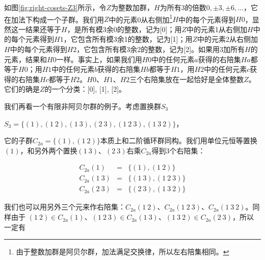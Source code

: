 \documentclass[b5paper]{ctexart}
\begin{document}
如图\ref{fig:right-cosets-Z3}所示，令$Z$为整数加群，$H$为所有3的倍数$0, \pm 3, \pm 6, ...$，它在加法下构成一个子群。我们用$Z$中的元素0从右侧加\footnote{由于整数加群是阿贝尔群，加法满足交换律，所以左右陪集相同。}$H$中的每个元素得到$H0$，显然这一结果还等于$H$，是所有模3余0的整数，记为[0]；用$Z$中的元素1从右侧加$H$中的每个元素得到$H1$，它包含所有模3余1的整数，记为[1]；用$Z$中的元素2从右侧加$H$中的每个元素得到$H2$，它包含所有模3余2的整数，记为[2]。如果用3加所有$H$的元素，结果和$H0$一样。事实上，如果我们用$H0$中的任何元素$a$获得的右陪集$Ha$都等于$H0$；用$H1$中的任何元素$b$获得的右陪集$Hb$都等于$H1$，用$H2$中的任何元素$c$获得的右陪集$Hc$都等于$H2$。$H0$、$H1$、$H2$三个右陪集放在一起恰好是全体整数$Z$。它们的确是$Z$的一个分类：[0], [1], [2]。


我们再看一个有限非阿贝尔群的例子。考虑置换群$S_3$

$S_3 = \{(1), (1\ 2), (1\ 3), (2\ 3), (1\ 2\ 3), (1\ 3\ 2)\}$，

它的子群$C_{2a} = \{(1), (1\ 2)\}$本质上和二阶循环群同构。我们用单位元恒等置换$(1)$，和另外两个置换$(1\ 3)$、$(2\ 3)$右乘$C_{2a}$得到3个右陪集：

\[
\begin{array}{rcl}
C_{2a} (1) & = & \{(1), (1\ 2)\} \\
C_{2a} (1\ 3) & = & \{(1\ 3), (1\ 2\ 3)\} \\
C_{2a} (2\ 3) & = & \{(2\ 3), (1\ 3\ 2)\}
\end{array}
\]

我们也可以用另外三个元来作右陪集：$C_{2a} (1\ 2)$、$C_{2a} (1\ 2\ 3)$、$C_{2a} (1\ 3\ 2)$。同样由于
$(1\ 2) \in C_{2a} (1)$、$(1\ 2\ 3) \in C_{2a} (1\ 3)$、$(1\ 3\ 2) \in C_{2a} (2\ 3)$，所以一定有
\end{document}
